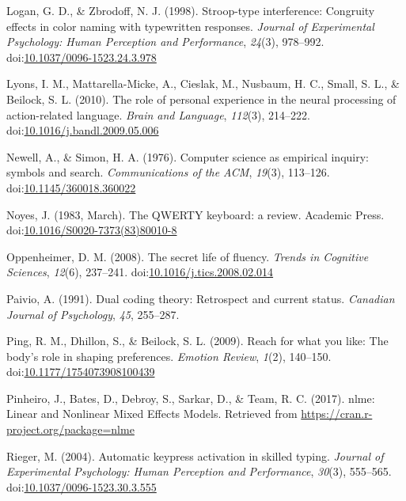 \documentclass[english,man]{apa6}
\theoremstyle{definition}
\theoremstyle{definition}
\theoremstyle{definition}
\theoremstyle{remark}
\begin{document}
\hypertarget{ref-Logan1998}{}
Logan, G. D., \& Zbrodoff, N. J. (1998). Stroop-type interference:
Congruity effects in color naming with typewritten responses.
\emph{Journal of Experimental Psychology: Human Perception and
Performance}, \emph{24}(3), 978--992.
doi:\href{https://doi.org/10.1037/0096-1523.24.3.978}{10.1037/0096-1523.24.3.978}

\hypertarget{ref-Lyons2010}{}
Lyons, I. M., Mattarella-Micke, A., Cieslak, M., Nusbaum, H. C., Small,
S. L., \& Beilock, S. L. (2010). The role of personal experience in the
neural processing of action-related language. \emph{Brain and Language},
\emph{112}(3), 214--222.
doi:\href{https://doi.org/10.1016/j.bandl.2009.05.006}{10.1016/j.bandl.2009.05.006}

\hypertarget{ref-Newell1976}{}
Newell, A., \& Simon, H. A. (1976). Computer science as empirical
inquiry: symbols and search. \emph{Communications of the ACM},
\emph{19}(3), 113--126.
doi:\href{https://doi.org/10.1145/360018.360022}{10.1145/360018.360022}

\hypertarget{ref-Noyes1983}{}
Noyes, J. (1983, March). The QWERTY keyboard: a review. Academic Press.
doi:\href{https://doi.org/10.1016/S0020-7373(83)80010-8}{10.1016/S0020-7373(83)80010-8}

\hypertarget{ref-Oppenheimer2008}{}
Oppenheimer, D. M. (2008). The secret life of fluency. \emph{Trends in
Cognitive Sciences}, \emph{12}(6), 237--241.
doi:\href{https://doi.org/10.1016/j.tics.2008.02.014}{10.1016/j.tics.2008.02.014}

\hypertarget{ref-Paivio1991}{}
Paivio, A. (1991). Dual coding theory: Retrospect and current status.
\emph{Canadian Journal of Psychology}, \emph{45}, 255--287.

\hypertarget{ref-Ping2009}{}
Ping, R. M., Dhillon, S., \& Beilock, S. L. (2009). Reach for what you
like: The body's role in shaping preferences. \emph{Emotion Review},
\emph{1}(2), 140--150.
doi:\href{https://doi.org/10.1177/1754073908100439}{10.1177/1754073908100439}

\hypertarget{ref-Pinheiro2017}{}
Pinheiro, J., Bates, D., Debroy, S., Sarkar, D., \& Team, R. C. (2017).
nlme: Linear and Nonlinear Mixed Effects Models. Retrieved from
\url{https://cran.r-project.org/package=nlme}

\hypertarget{ref-Rieger2004}{}
Rieger, M. (2004). Automatic keypress activation in skilled typing.
\emph{Journal of Experimental Psychology: Human Perception and
Performance}, \emph{30}(3), 555--565.
doi:\href{https://doi.org/10.1037/0096-1523.30.3.555}{10.1037/0096-1523.30.3.555}
\end{document}
